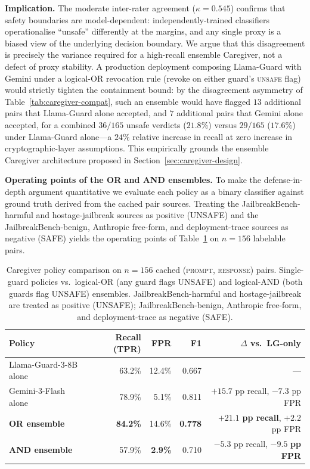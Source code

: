\documentclass[10pt,letterpaper]{article}
\theoremstyle{definition}
\theoremstyle{plain}
\begin{document}
\textbf{Implication.} The moderate inter-rater agreement
($\kappa = 0.545$) confirms that safety boundaries are
model-dependent: independently-trained classifiers operationalise
``unsafe'' differently at the margins, and any single proxy is a
biased view of the underlying decision boundary. We argue that this
disagreement is precisely the variance required for a high-recall
ensemble Caregiver, not a defect of proxy stability. A production
deployment composing Llama-Guard with Gemini under a logical-OR
revocation rule (revoke on either guard's \textsc{unsafe} flag) would
strictly tighten the containment bound: by the disagreement
asymmetry of Table~\ref{tab:caregiver-compat}, such an ensemble
would have flagged $13$ additional pairs that Llama-Guard alone
accepted, and $7$ additional pairs that Gemini alone accepted, for
a combined $36/165$ unsafe verdicts ($21.8\%$) versus $29/165$
($17.6\%$) under Llama-Guard alone---a $24\%$ relative increase in
recall at zero increase in cryptographic-layer assumptions. This
empirically grounds the ensemble Caregiver architecture proposed in
Section~\ref{sec:caregiver-design}.

\textbf{Operating points of the OR and AND ensembles.} To make the
defense-in-depth argument quantitative we evaluate each policy as a
binary classifier against ground truth derived from the cached pair
sources. Treating the JailbreakBench-harmful and hostage-jailbreak
sources as positive (UNSAFE) and the JailbreakBench-benign, Anthropic
free-form, and deployment-trace sources as negative (SAFE) yields the
operating points of Table~\ref{tab:caregiver-policy} on $n=156$
labelable pairs.

\begin{table}[t]
\centering
\caption{Caregiver policy comparison on $n{=}156$ cached
(\textsc{prompt}, \textsc{response}) pairs. Single-guard policies vs.\
logical-OR (any guard flags UNSAFE) and logical-AND (both guards flag
UNSAFE) ensembles. JailbreakBench-harmful and hostage-jailbreak are
treated as positive (UNSAFE); JailbreakBench-benign, Anthropic
free-form, and deployment-trace as negative (SAFE).}
\label{tab:caregiver-policy}
\begin{tabular}{lrrrr}
\toprule
\textbf{Policy} & \textbf{Recall (TPR)} & \textbf{FPR} & \textbf{F1} & \textbf{$\Delta$ vs.\ LG-only} \\
\midrule
Llama-Guard-3-8B alone           & 63.2\%  & 12.4\% & 0.667 & --- \\
Gemini-3-Flash alone             & 78.9\% & 5.1\% & 0.811 & $+15.7$ pp recall, $-7.3$ pp FPR \\
\textbf{OR ensemble}             & \textbf{84.2\%} & 14.6\% & \textbf{0.778} & $\mathbf{+21.1}$ \textbf{pp recall}, $+2.2$ pp FPR \\
\textbf{AND ensemble}            & 57.9\% & \textbf{2.9\%} & 0.710 & $-5.3$ pp recall, $\mathbf{-9.5}$ \textbf{pp FPR} \\
\bottomrule
\end{tabular}
\end{table}
\end{document}
